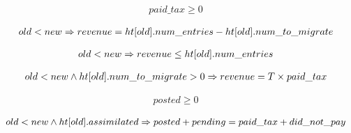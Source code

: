 \begin{lemma}        
  \begin{equation*}
\begin{array}{l}
  paid\_tax \geq 0
\end{array}
\end{equation*}
  \label{paid_tax1}  
\end{lemma}


\begin{lemma}
  \begin{equation*}
\begin{array}{l}        
  old < new \Rightarrow revenue = \mbox{$ht[old]$}.num\_entries - \mbox{$ht[old]$}.num\_to\_migrate
\end{array}
\end{equation*}  
  \label{revenue1}    
\end{lemma}

\begin{lemma}
  \begin{equation*}[Upper bound for revenue]
\begin{array}{l}        
  old < new \Rightarrow revenue \leq \HT{old}.num\_entries
\end{array}
\end{equation*}
  \label{revenue2}    
\end{lemma}

\begin{lemma}
    \begin{equation*}
\begin{array}{l}      
  old < new \wedge \mbox{$ht[old]$}.num\_to\_migrate > 0 \Rightarrow revenue = T \times paid\_tax
\end{array}
    \end{equation*}  
    \label{revenue3}    
\end{lemma}

\begin{lemma}
    \begin{equation*}
\begin{array}{l}      
  posted \geq 0
\end{array}
    \end{equation*}  
    \label{posted0}  
\end{lemma}

\begin{lemma}
  \begin{equation*}
    \begin{array}{l}      
      old < new \wedge \mbox{$ht[old]$}.assimilated \Rightarrow posted+ pending = paid\_tax + did\_not\_pay
    \end{array}
  \end{equation*}    
  \label{posted1}
\end{lemma}

